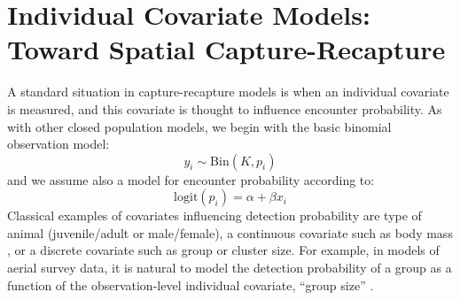 \section{Individual Covariate Models: Toward Spatial Capture-Recapture}
\label{closed.sec.indcov}


A standard situation in capture-recapture models is when an individual
covariate is measured, and this covariate is thought to influence
encounter probability.  As with other closed population models, we
begin with the basic binomial observation model:
\[
y_{i} \sim \mbox{Bin}(K, p_{i})
\]
and we assume also  a model for encounter probability according to:
\begin{equation}
 \mbox{logit}(p_{i}) = \alpha + \beta x_{i}
\label{closed.eq.ha}
\end{equation}
Classical examples of covariates influencing detection probability are
type of animal (juvenile/adult or male/female), a continuous covariate
such as body mass \citep[][ch. 6]{royle_dorazio:2008}, or a
discrete covariate such as group or cluster size. For example, in
models of aerial survey data, it is natural to model the detection
probability of a group as a function of the observation-level individual
covariate, ``group size'' \citep{royle:2008, royle:2009,
  langtimm_etal:2011}.

